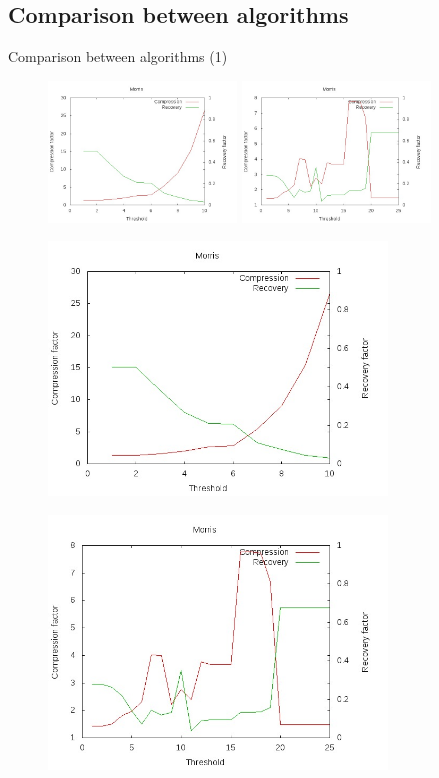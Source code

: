 \documentclass[10pt]{beamer}
\begin{document}
\subsection{Comparison between algorithms}


\begin{frame}{Comparison between algorithms (1)}
 {
\begin{figure}
\centering
\includegraphics[width = 5cm]{images/Morris77.jpg} \hspace{0.5cm}
\includegraphics[width = 5cm]{images/MorrisDiag.jpg}
\end{figure}}

 {
\begin{figure}
\centering
\includegraphics[width = 9cm]{images/Morris77.jpg}
\end{figure}}

 {
\begin{figure}
\centering
\includegraphics[width = 9cm]{images/MorrisDiag.jpg}
\end{figure}}
\end{frame}
\end{document}
